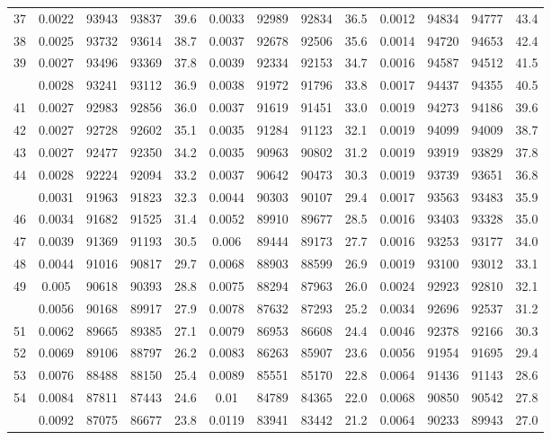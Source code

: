 \documentclass[
  14pt,
]{article}
\begin{document}
\begin{longtable}[t]{lcccccccccccc}
37 & 0.0022 & 93943 & 93837 & 39.6 & 0.0033 & 92989 & 92834 & 36.5 & 0.0012 & 94834 & 94777 & 43.4\\
38 & 0.0025 & 93732 & 93614 & 38.7 & 0.0037 & 92678 & 92506 & 35.6 & 0.0014 & 94720 & 94653 & 42.4\\
39 & 0.0027 & 93496 & 93369 & 37.8 & 0.0039 & 92334 & 92153 & 34.7 & 0.0016 & 94587 & 94512 & 41.5\\
\addlinespace
40 & 0.0028 & 93241 & 93112 & 36.9 & 0.0038 & 91972 & 91796 & 33.8 & 0.0017 & 94437 & 94355 & 40.5\\
41 & 0.0027 & 92983 & 92856 & 36.0 & 0.0037 & 91619 & 91451 & 33.0 & 0.0019 & 94273 & 94186 & 39.6\\
42 & 0.0027 & 92728 & 92602 & 35.1 & 0.0035 & 91284 & 91123 & 32.1 & 0.0019 & 94099 & 94009 & 38.7\\
43 & 0.0027 & 92477 & 92350 & 34.2 & 0.0035 & 90963 & 90802 & 31.2 & 0.0019 & 93919 & 93829 & 37.8\\
44 & 0.0028 & 92224 & 92094 & 33.2 & 0.0037 & 90642 & 90473 & 30.3 & 0.0019 & 93739 & 93651 & 36.8\\
\addlinespace
45 & 0.0031 & 91963 & 91823 & 32.3 & 0.0044 & 90303 & 90107 & 29.4 & 0.0017 & 93563 & 93483 & 35.9\\
46 & 0.0034 & 91682 & 91525 & 31.4 & 0.0052 & 89910 & 89677 & 28.5 & 0.0016 & 93403 & 93328 & 35.0\\
47 & 0.0039 & 91369 & 91193 & 30.5 & 0.006 & 89444 & 89173 & 27.7 & 0.0016 & 93253 & 93177 & 34.0\\
48 & 0.0044 & 91016 & 90817 & 29.7 & 0.0068 & 88903 & 88599 & 26.9 & 0.0019 & 93100 & 93012 & 33.1\\
49 & 0.005 & 90618 & 90393 & 28.8 & 0.0075 & 88294 & 87963 & 26.0 & 0.0024 & 92923 & 92810 & 32.1\\
\addlinespace
50 & 0.0056 & 90168 & 89917 & 27.9 & 0.0078 & 87632 & 87293 & 25.2 & 0.0034 & 92696 & 92537 & 31.2\\
51 & 0.0062 & 89665 & 89385 & 27.1 & 0.0079 & 86953 & 86608 & 24.4 & 0.0046 & 92378 & 92166 & 30.3\\
52 & 0.0069 & 89106 & 88797 & 26.2 & 0.0083 & 86263 & 85907 & 23.6 & 0.0056 & 91954 & 91695 & 29.4\\
53 & 0.0076 & 88488 & 88150 & 25.4 & 0.0089 & 85551 & 85170 & 22.8 & 0.0064 & 91436 & 91143 & 28.6\\
54 & 0.0084 & 87811 & 87443 & 24.6 & 0.01 & 84789 & 84365 & 22.0 & 0.0068 & 90850 & 90542 & 27.8\\
\addlinespace
55 & 0.0092 & 87075 & 86677 & 23.8 & 0.0119 & 83941 & 83442 & 21.2 & 0.0064 & 90233 & 89943 & 27.0\\

\end{longtable}
\end{document}

